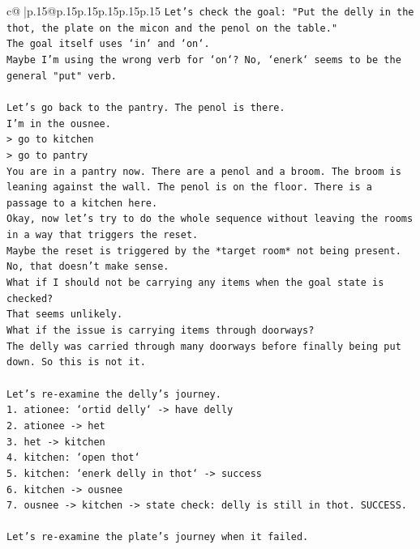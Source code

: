\documentclass{article}
\begin{document}
{\begin{supertabular}{c@{$\;$}|p{.15\linewidth}@{}p{.15\linewidth}p{.15\linewidth}p{.15\linewidth}p{.15\linewidth}p{.15\linewidth}}
{{{\texttt{Let's check the goal: "Put the delly in the thot, the plate on the micon and the penol on the table."} \\
\texttt{The goal itself uses `in` and `on`.} \\
\texttt{Maybe I'm using the wrong verb for `on`? No, `enerk` seems to be the general "put" verb.} \\
\\ 
\texttt{Let's go back to the pantry. The penol is there.} \\
\texttt{I'm in the ousnee.} \\
\texttt{> go to kitchen} \\
\texttt{> go to pantry} \\
\texttt{You are in a pantry now. There are a penol and a broom. The broom is leaning against the wall. The penol is on the floor. There is a passage to a kitchen here.} \\
\texttt{Okay, now let's try to do the whole sequence without leaving the rooms in a way that triggers the reset.} \\
\texttt{Maybe the reset is triggered by the *target room* not being present.} \\
\texttt{No, that doesn't make sense.} \\
\texttt{What if I should not be carrying any items when the goal state is checked?} \\
\texttt{That seems unlikely.} \\
\texttt{What if the issue is carrying items through doorways?} \\
\texttt{The delly was carried through many doorways before finally being put down. So this is not it.} \\
\\ 
\texttt{Let's re{-}examine the delly's journey.} \\
\texttt{1. ationee: `ortid delly` {-}> have delly} \\
\texttt{2. ationee {-}> het} \\
\texttt{3. het {-}> kitchen} \\
\texttt{4. kitchen: `open thot`} \\
\texttt{5. kitchen: `enerk delly in thot` {-}> success} \\
\texttt{6. kitchen {-}> ousnee} \\
\texttt{7. ousnee {-}> kitchen {-}> state check: delly is still in thot. SUCCESS.} \\
\\ 
\texttt{Let's re{-}examine the plate's journey when it failed.} \\
}}}
\end{supertabular}}
\end{document}
